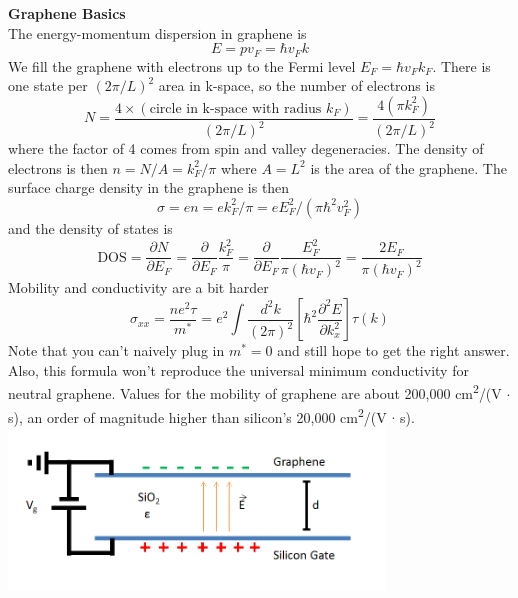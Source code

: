 \documentclass[a4paper,12pt]{article}
\begin{document}
\textbf{Graphene Basics} \\

The energy-momentum dispersion in graphene is
\begin{equation}
E=p v_F=\hbar v_F k
\end{equation}
We fill the graphene with electrons up to the Fermi level $E_F = \hbar v_F k_F$.  There is one state per $(2 \pi / L)^2$ area in k-space, so the number of electrons is
\begin{equation}
N=\frac{4 \times (\text{circle in k-space with radius } k_F)}{(2 \pi / L)^2} = \frac{4(\pi k_F^2)}{(2 \pi /L)^2}
\end{equation}
where the factor of 4 comes from spin and valley degeneracies.  The density of electrons is then $n=N/A=k_F^2/\pi$ where $A=L^2$ is the area of the graphene.  The surface charge density in the graphene is then
\begin{equation}
\sigma = e n = e k_F^2/\pi = e E_F^2 /(\pi \hbar^2 v_F^2)
\end{equation}
and the density of states is
\begin{equation}
\text{DOS} = \frac{\partial N}{\partial E_F} = \frac{\partial}{\partial E_F} \frac{k_F^2}{\pi} = \frac{\partial}{\partial E_F} \frac{E_F^2}{\pi (\hbar v_F)^2} = \frac{2 E_F}{\pi (\hbar v_F)^2}
\end{equation}
Mobility and conductivity are a bit harder
\begin{equation}
\sigma_{xx}=\frac{n e^2 \tau}{m^*}=e^2 \int \frac{d^2k}{(2\pi)^2} \left[ \hbar^2 \frac{\partial^2 E}{\partial k_x^2} \right] \tau(k)
\end{equation}
Note that you can't naively plug in $m^*=0$ and still hope to get the right answer.  Also, this formula won't reproduce the universal minimum conductivity for neutral graphene.  Values for the mobility of graphene are about 200,000 cm\textsuperscript{2}/(V $\cdot$ s), an order of magnitude higher than silicon's 20,000 cm\textsuperscript{2}/(V $\cdot$ s). \\
\includegraphics[width=100mm]{GrapheneDevice.png}
\end{document}
